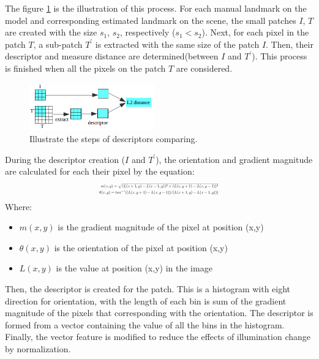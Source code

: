\documentclass[twoside,twocolumn,10pt]{article}
\begin{document}
The figure \ref{fig:Illustrate} is the illustration of this process. For each manual landmark on the model and corresponding estimated landmark on the scene, the small patches \textit{$I$}, \textit{$T$} are created with the size $s_1$, $s_2$, respectively ($s_1 < s_2$). Next, for each pixel in the patch \textit{$T$}, a sub-patch \textit{$T^{'}$} is extracted with the same size of the patch \textit{$I$}. Then, their descriptor and measure distance are determined(between \textit{$I$} and \textit{$T^{'}$}). This process is finished when all the pixels on the patch \textit{$T$} are considered.
\begin{figure}[htb]
    \centering
    \includegraphics[width=0.48\textwidth]{./images/illustration_SIFT}
    \caption{Illustrate the steps of descriptors comparing.}
    \label{fig:Illustrate}
\end{figure}

During the descriptor creation (\textit{$I$} and \textit{$T^{'}$}), the orientation and gradient magnitude are calculated for each their pixel by the equation:
\begin{equation}
\label{eq:sift}
\resizebox{.41 \textwidth}{!} 
{$
\begin{aligned}
	m(x,y) = \sqrt{(L(x+1,y) - L(x-1,y))^2 + (L(x,y+1) - L(x,y-1))^2} \\
	\theta(x,y) = tan^{-1}((L(x,y+1) - L(x,y-1))/(L(x+1,y) - L(x-1,y)))
	\end{aligned}
$}
\end{equation}
Where:
\begin{itemize}
	\item $m(x,y)$ is the gradient magnitude of the pixel at position (x,y)
	\item $\theta(x,y)$ is the orientation of the pixel at position (x,y)
	\item $L(x,y)$ is the value at position (x,y) in the image
\end{itemize}
Then, the descriptor is created for the patch. This is a histogram with eight direction for orientation, with the length of each bin is sum of the gradient magnitude of the pixels that corresponding  with the orientation. The descriptor is formed from a vector containing the value of all the bins in the histogram. Finally, the vector feature is modified to reduce the effects of illumination change by normalization.
\end{document}
